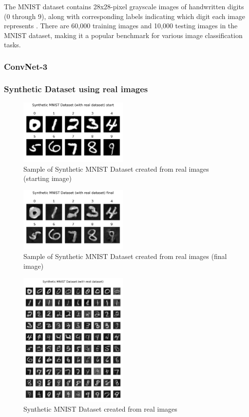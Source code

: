 \documentclass[conference, compsoc]{IEEEtran}
\begin{document}
The MNIST dataset contains 28x28-pixel grayscale images of handwritten digits (0 through 9), along with corresponding labels indicating which digit each image represents \cite{deng2012mnist}. There are 60,000 training images and 10,000 testing images in the MNIST dataset, making it a popular benchmark for various image classification tasks.
\subsubsection{ConvNet-3}
\subsubsection{Synthetic Dataset using real images}
\begin{figure}[H]
	\centering
	\includegraphics[width=0.48\textwidth]{mnist_real_sample.png}
	\caption{Sample of Synthetic MNIST Dataset created from real images (starting image)}
	\label{fig:mnist_real_sample}
\end{figure}

\begin{figure}[H]
	\centering
	\includegraphics[width=0.48\textwidth]{mnist_real_syn.png}
	\caption{Sample of Synthetic MNIST Dataset created from real images (final image)}
	\label{fig:mnist_real_syn}
\end{figure}

\begin{figure}[H]
	\centering
	\includegraphics[width=0.48\textwidth]{mnist_real_syn_all.png}
	\caption{Synthetic MNIST Dataset created from real images}
	\label{fig:mnist_real_syn_all}
\end{figure}
\end{document}

